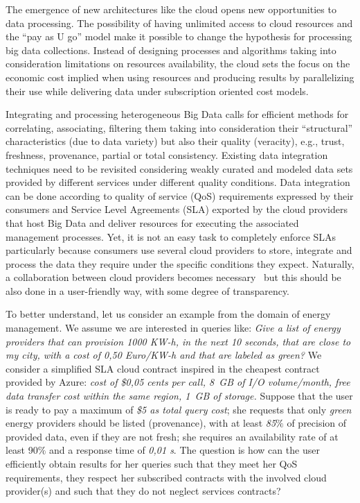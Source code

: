 The emergence of new architectures like the cloud opens new opportunities to data processing. 
The possibility of having unlimited access to cloud resources and the ``pay as U go'' model make it possible to change the hypothesis for processing big  data collections.  Instead of designing processes and algorithms taking into consideration  limitations on resources availability, the cloud sets the focus on the economic cost implied when using resources and producing results by parallelizing their use while delivering data under subscription oriented cost models.
 
Integrating and processing heterogeneous Big Data calls for efficient methods for correlating, associating, filtering them taking into consideration their ``structural'' characteristics (due to data variety) but also their quality (veracity), e.g., trust, freshness, provenance, partial or total consistency. 
Existing data integration techniques need to be revisited considering weakly curated and modeled data sets provided by different services under different quality conditions. Data integration can be done according to quality of service (QoS) requirements expressed by their consumers and Service Level Agreements (SLA)  exported by the cloud providers that host  Big Data and deliver resources for executing the associated management processes. Yet, it is not an easy task to completely enforce SLAs particularly because consumers use several cloud providers to store, integrate and process the data they require under the specific conditions they expect.
Naturally, a collaboration between cloud providers becomes necessary~\cite{036} but this should be also done in a user-friendly way, with some degree of transparency. 

To better understand, let us consider an example from the domain of energy
management. We assume we are interested in queries like: \textit{Give a list
of energy providers that can provision 1000 KW-h, in the next 10 seconds, that are close to my city, with a cost of 0,50 Euro/KW-h and that are labeled as green?} We consider a simplified SLA cloud contract inspired in the cheapest contract provided by Azure: \textit{cost of \$0,05 cents per call,  8~GB of I/O volume/month, free data transfer cost within the same region,  1~GB of storage.} 
Suppose that the user is ready to pay a maximum of \textit{\$5 as total query cost}; she requests that only  \textit{green} energy providers should be  listed (provenance), with at least  \textit{85$\%$} of precision of provided data, even if they are not fresh; she requires an availability rate of at least 90$\%$ and a response time of  \textit{0,01 s}. 
  The question is how can the user efficiently obtain  results for her queries such that they meet her QoS requirements, they respect her subscribed contracts with the involved cloud provider(s) and such that they do not neglect services contracts? 

